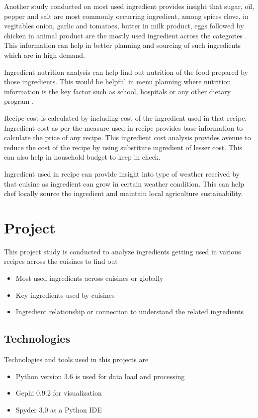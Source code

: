 \documentclass[sigconf]{acmart}
\begin{document}
Another study conducted on most used ingredient provides insight that sugar, oil, pepper and salt are most commonly occurring ingredient, among spices clove, in vegitables onion,  garlic  and tomatoes, butter in milk product, eggs followed by chicken in animal product are the mostly used ingredient across the categories \cite{Chatterjee2016}. This information can help in better planning and sourcing of such ingredients which are in high demand.

Ingredient nutrition analysis can help find out nutrition of the food prepared by those ingredients. This would be helpful in menu planning where nutrition information is the key factor such as school, hospitals or any other dietary program \cite{www-onlinelibrary}.

Recipe cost is calculated by including cost of the ingredient used in that recipe. Ingredient cost as per the measure used in recipe provides base information to calculate the price of any recipe. This ingredient cost analysis provides avenue to reduce the cost of the recipe by using substitute ingredient of lesser cost. This can also help in household budget to keep in check.

Ingredient used in recipe can provide insight into type of weather received by that cuisine as ingredient can grow in certain weather condition. This can help chef locally source the ingredient and maintain local agriculture sustainability. 


\section{Project}
This project study is conducted to analyze ingredients getting used in various recipes across the cuisines to find out
\begin{itemize}
\item Most used ingredients across cuisines or globally
\item Key ingredients used by cuisines
\item Ingredient relationship or connection to understand the related ingredients
\end{itemize}

\subsection{Technologies}
Technologies and tools used in this projects are
\begin{itemize}
\item Python version 3.6 is used for data load and processing
\item Gephi 0.9.2 for visualization
\item Spyder 3.0 as a Python IDE
\end{itemize}
\end{document}

